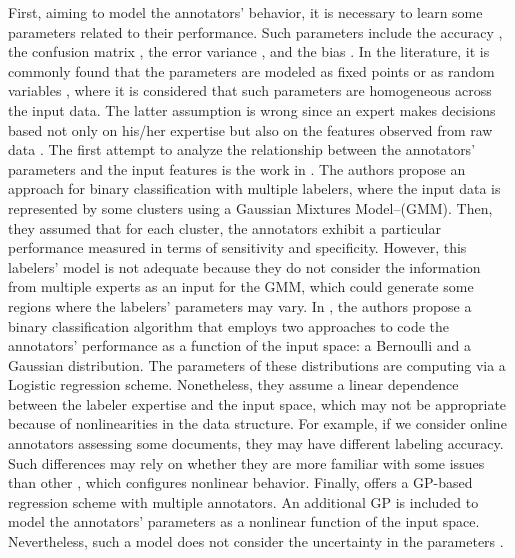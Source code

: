 \documentclass[journal]{IEEEtran}
\begin{document}
First, aiming to model the annotators' behavior, it is necessary to learn some parameters related to their performance. Such parameters include the accuracy \cite{rodrigues2013learning}, the confusion matrix \cite{gonzalez2015automatic}, the error variance \cite{raykar2010learning}, and the bias \cite{rodrigues2017learning}. In the literature, it is commonly found that the parameters are modeled as fixed points \cite{rodrigues2014gaussian} or as random variables \cite{morales2019scalable}, where it is considered that such parameters are homogeneous across the input data. The latter assumption is wrong since an expert makes decisions based not only on his/her expertise but also on the features observed from raw data \cite{raykar2010learning}. The first attempt to analyze the relationship between the annotators' parameters and the input features is the work in \cite{zhang2011learning}. The authors propose an approach for binary classification with multiple labelers, where the input data is represented by some clusters using a Gaussian Mixtures Model--(GMM). Then, they assumed that for each cluster, the annotators exhibit a particular performance measured in terms of sensitivity and specificity. However, this labelers' model is not adequate because they do not consider the information from multiple experts as an input for the GMM, which could generate some regions where the labelers' parameters may vary. In \cite{yan2014learning}, the authors propose a binary classification algorithm that employs two approaches to code the annotators' performance as a function of the input space: a Bernoulli and a Gaussian distribution. The parameters of these distributions are computing via a Logistic regression scheme. Nonetheless, they assume a linear dependence between the labeler expertise and the input space, which may not be appropriate because of nonlinearities in the data structure. For example, if we consider online annotators assessing some documents, they may have different labeling accuracy. Such differences may rely on whether they are more familiar with some issues than other \cite{wang2016bi}, which configures nonlinear behavior. Finally, \cite{xiao2013learning} offers a GP-based regression scheme with multiple annotators. An additional GP is included to model the annotators' parameters as a nonlinear function of the input space. Nevertheless, such a model does not consider the uncertainty in the parameters \cite{bishop2006pattern}.
\end{document}
